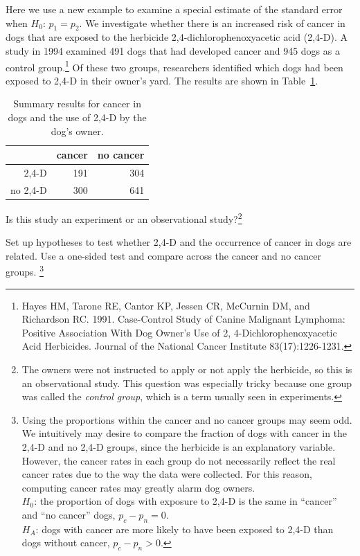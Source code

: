 
Here we use a new example to examine a special estimate of the standard error when $H_0$: $p_1 = p_2$. We investigate whether there is an increased risk of cancer in dogs that are exposed to the herbicide 2,4-dichlorophenoxyacetic acid (2,4-D). A study in 1994 examined 491 dogs that had developed cancer and 945 dogs as a control group.\footnote{Hayes HM, Tarone RE, Cantor KP, Jessen CR, McCurnin DM, and Richardson RC. 1991. Case-Control Study of Canine Malignant Lymphoma: Positive Association With Dog Owner's Use of 2, 4-Dichlorophenoxyacetic Acid Herbicides. Journal of the National Cancer Institute 83(17):1226-1231.} Of these two groups, researchers identified which dogs had been exposed to 2,4-D in their owner's yard. The results are shown in Table~\ref{24DAndCancerInDogs}.

\begin{table}[h]
\centering
\begin{tabular}{rrr}
  \hline
 & cancer & no cancer \\
  \hline
2,4-D & 191 & 304 \\
no 2,4-D & 300 & 641 \\
   \hline
\end{tabular}
\caption{Summary results for cancer in dogs and the use of 2,4-D by the dog's owner.}
\label{24DAndCancerInDogs}
\end{table}

\begin{exercise}
Is this study an experiment or an observational study?\footnote{The owners were not instructed to apply or not apply the herbicide, so this is an observational study. This question was especially tricky because one group was called the \emph{control group}, which is a term usually seen in experiments.}
\end{exercise}

\begin{exercise}\label{htFor24DAndCancerInDogs}
Set up hypotheses to test whether 2,4-D and the occurrence of cancer in dogs are related. Use a one-sided test and compare across the cancer and no cancer groups.%
\footnote{Using the proportions within the cancer and no cancer groups may seem odd. We intuitively may desire to compare the fraction of dogs with cancer in the 2,4-D and no 2,4-D groups, since the herbicide is an explanatory variable. However, the cancer rates in each group do not necessarily reflect the real cancer rates due to the way the data were collected. For this reason, computing cancer rates may greatly alarm dog owners. \\ $H_0$: the proportion of dogs with exposure to 2,4-D is the same in ``cancer'' and ``no cancer'' dogs, $p_c - p_n = 0$. \\ $H_A$: dogs with cancer are more likely to have been exposed to 2,4-D than dogs without cancer, $p_c - p_n > 0$.}
\end{exercise}

